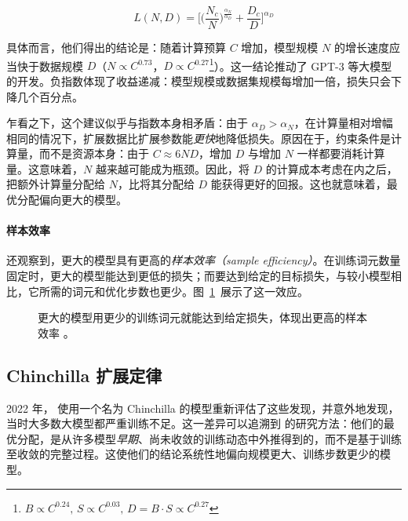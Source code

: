 \begin{equation}
\label{eq:joint-power}
L(N, D) = \Big[ \Big(\frac{N_c}{N}\Big)^{\frac{\alpha_N}{\alpha_D}} + \frac{D_c}{D} \Big]^{\alpha_D}
\end{equation}

具体而言，他们得出的结论是：随着计算预算 $C$ 增加，模型规模 $N$ 的增长速度应当快于数据规模 $D$（$N \propto C^{0.73}$，$D \propto C^{0.27}$\footnote{$B\propto C^{0.24},\,S\propto C^{0.03},\, D=B\cdot S \propto C^{0.27}$}）。这一结论推动了 GPT-3 等大模型的开发。负指数体现了收益递减：模型规模或数据集规模每增加一倍，损失只会下降几个百分点。

乍看之下，这个建议似乎与指数本身相矛盾：由于 $\alpha_D > \alpha_N$，在计算量相对增幅相同的情况下，扩展数据比扩展参数能\emph{更快}地降低损失。原因在于，约束条件是计算量，而不是资源本身：由于 $C \approx 6ND$，增加 $D$ 与增加 $N$ 一样都要消耗计算量。这意味着，$N$ 越来越可能成为瓶颈。因此，将 $D$ 的计算成本考虑在内之后，把额外计算量分配给 $N$，比将其分配给 $D$ 能获得更好的回报。这也就意味着，最优分配偏向更大的模型。

\paragraph{样本效率}
\citet{kaplan2020scalinglawsneurallanguage} 还观察到，更大的模型具有更高的\emph{样本效率（sample efficiency）}。在训练词元数量固定时，更大的模型能达到更低的损失；而要达到给定的目标损失，与较小模型相比，它所需的词元和优化步数也更少。图~\ref{fig:sample-efficiency-tokens}~展示了这一效应。

\begin{figure}[t]
    \centering
    
    \caption{更大的模型用更少的训练词元就能达到给定损失，体现出更高的样本效率 \citep{kaplan2020scalinglawsneurallanguage}。}
    \label{fig:sample-efficiency-tokens}
\end{figure}

\subsection{Chinchilla 扩展定律}
2022 年，\citet{10.5555/3600270.3602446} 使用一个名为 Chinchilla 的模型重新评估了这些发现，并意外地发现，当时大多数大模型都严重训练不足。这一差异可以追溯到 \citet{kaplan2020scalinglawsneurallanguage} 的研究方法：他们的最优分配，是从许多模型\emph{早期}、尚未收敛的训练动态中外推得到的，而不是基于训练至收敛的完整过程。这使他们的结论系统性地偏向规模更大、训练步数更少的模型。

